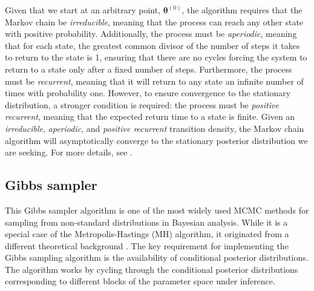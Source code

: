 Given that we start at an arbitrary point, $\bm{\theta}^{(0)}$, the algorithm requires that the Markov chain be \textit{irreducible}, meaning that the process can reach any other state with positive probability. Additionally, the process must be \textit{aperiodic}, meaning that for each state, the greatest common divisor of the number of steps it takes to return to the state is 1, ensuring that there are no cycles forcing the system to return to a state only after a fixed number of steps. Furthermore, the process must be \textit{recurrent}, meaning that it will return to any state an infinite number of times with probability one. However, to ensure convergence to the stationary distribution, a stronger condition is required: the process must be \textit{positive recurrent}, meaning that the expected return time to a state is finite. Given an \textit{irreducible}, \textit{aperiodic}, and \textit{positive recurrent} transition density, the Markov chain algorithm will asymptotically converge to the stationary posterior distribution we are seeking. For more details, see \cite[chap.~6]{robert2011monte}.
   

\subsection{Gibbs sampler}\label{sec511}

This Gibbs sampler algorithm is one of the most widely used MCMC methods for sampling from non-standard distributions in Bayesian analysis. While it is a special case of the Metropolis-Hastings (MH) algorithm, it originated from a different theoretical background \cite{Geman1984,Gelfand1990}. The key requirement for implementing the Gibbs sampling algorithm is the availability of conditional posterior distributions. The algorithm works by cycling through the conditional posterior distributions corresponding to different blocks of the parameter space under inference.

